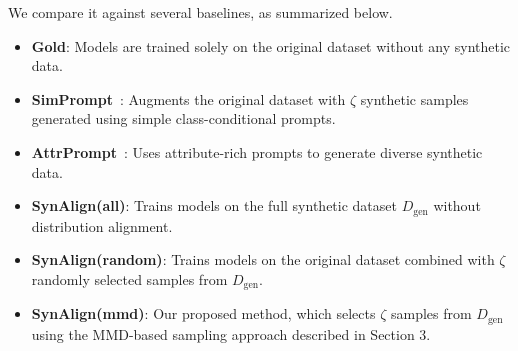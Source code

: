 We compare it against several baselines, as summarized below.
\begin{itemize}
    \item \textbf{Gold}: Models are trained solely on the original dataset without any synthetic data. 
    \item \textbf{SimPrompt}~\cite{chen2023mixturesoftpromptscontrollable}: Augments the original dataset with $\zeta$ synthetic samples generated using simple class-conditional prompts.
    \item \textbf{AttrPrompt}~\cite{attriprompt}: Uses attribute-rich prompts to generate diverse synthetic data.
    \item \textbf{SynAlign(all)}: Trains models on the full synthetic dataset $D_{\text{gen}}$ without distribution alignment. 
    \item \textbf{SynAlign(random)}: Trains models on the original dataset combined with $\zeta$ randomly selected samples from $D_{\text{gen}}$. 
    \item \textbf{SynAlign(mmd)}: Our proposed method, which selects $\zeta$ samples from $D_{\text{gen}}$ using the MMD-based sampling approach described in Section 3.
\end{itemize}




